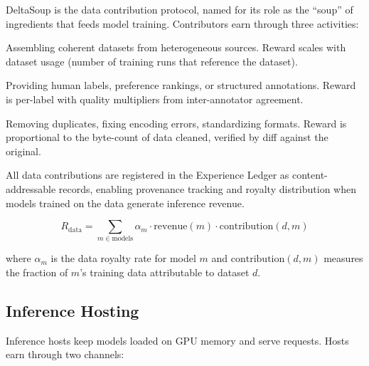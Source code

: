 DeltaSoup is the data contribution protocol, named for its role as the ``soup'' of ingredients that feeds model training. Contributors earn \BLG{} through three activities:

\begin{description}[nosep]
    \item[Curation] Assembling coherent datasets from heterogeneous sources. Reward scales with dataset usage (number of training runs that reference the dataset).
    \item[Labeling/Annotation] Providing human labels, preference rankings, or structured annotations. Reward is per-label with quality multipliers from inter-annotator agreement.
    \item[Cleaning/Deduplication] Removing duplicates, fixing encoding errors, standardizing formats. Reward is proportional to the byte-count of data cleaned, verified by diff against the original.
\end{description}

All data contributions are registered in the Experience Ledger \cite{zoo-experience-ledger} as content-addressable records, enabling provenance tracking and royalty distribution when models trained on the data generate inference revenue.

\begin{equation}
R_{\text{data}} = \sum_{m \in \text{models}} \alpha_m \cdot \text{revenue}(m) \cdot \text{contribution}(d, m)
\end{equation}

where $\alpha_m$ is the data royalty rate for model $m$ and $\text{contribution}(d, m)$ measures the fraction of $m$'s training data attributable to dataset $d$.

\subsection{Inference Hosting}

Inference hosts keep models loaded on GPU memory and serve requests. Hosts earn \BLG{} through two channels:

